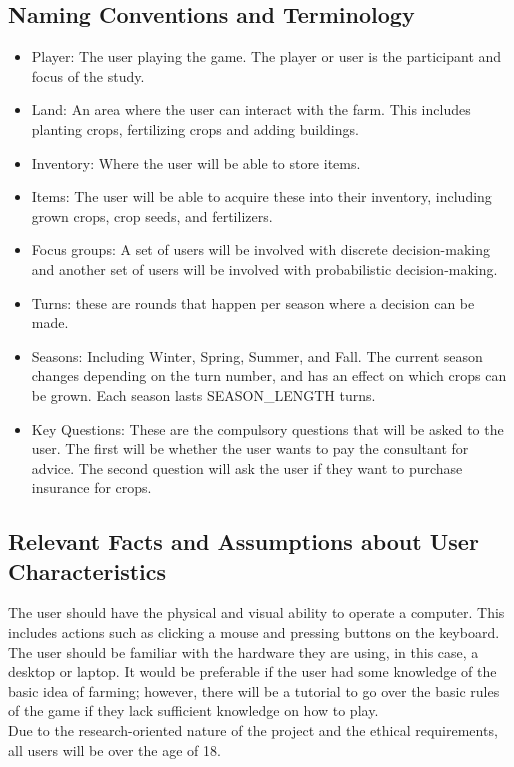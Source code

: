 \documentclass{article}
\begin{document}
\subsection{Naming Conventions and Terminology}
\begin{itemize}
    \item Player: The user playing the game. The player or user is the participant and focus of the study.
    \item Land: An area where the user can interact with the farm. This includes planting crops, fertilizing crops and adding buildings.
    \item Inventory: Where the user will be able to store items.
    \item Items: The user will be able to acquire these into their inventory, including grown crops, crop seeds, and fertilizers.
    \item Focus groups: A set of users will be involved with discrete decision-making and another set of users will be involved with probabilistic decision-making.
    \item Turns: these are rounds that happen per season where a decision can be made. 
    \item Seasons: Including Winter, Spring, Summer, and Fall. The current season changes depending on the turn number, and has an effect on which crops can be grown. Each season lasts SEASON\_LENGTH turns.
    \item Key Questions: These are the compulsory questions that will be asked to the user. The first will be whether the user wants to pay the consultant for advice. The second question will ask the user if they want to purchase insurance for crops.
\end{itemize}
\subsection{Relevant Facts and Assumptions about User Characteristics}

The user should have the physical and visual ability to operate a computer. This includes actions such as clicking a mouse and pressing buttons on the keyboard. The user should be familiar with the hardware they are using, in this case, a desktop or laptop. It would be preferable if the user had some knowledge of the basic idea of farming; however, there will be a tutorial to go over the basic rules of the game if they lack sufficient knowledge on how to play. 
\\ Due to the research-oriented nature of the project and the ethical requirements, all users will be over the age of 18.
\end{document}

